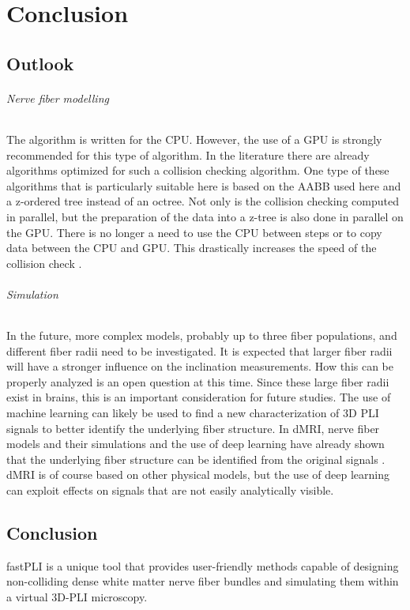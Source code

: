 \cleardoublepage
\part{Conclusion}
% 
% 
% 
\setcounter{chapter}{8}
\chapter{Outlook}
\label{sec:outlook}
% 
% 
\paragraph{Nerve fiber modelling}
% 
The algorithm is written for the \ac{CPU}.
However, the use of a \ac{GPU} is strongly recommended for this type of algorithm.
In the literature there are already algorithms optimized for such a collision checking algorithm.
One type of these algorithms that is particularly suitable here is based on the \ac{AABB} used here and a z-ordered tree instead of an octree.
Not only is the collision checking computed in parallel, but the preparation of the data into a z-tree is also done in parallel on the \ac{GPU}.
There is no longer a need to use the \ac{CPU} between steps or to copy data between the \ac{CPU} and \ac{GPU}.
This drastically increases the speed of the collision check \cite{Karras2012}. 
% 
% 
% 
\paragraph{Simulation}
% 
In the future, more complex models, probably up to three fiber populations, and different fiber radii need to be investigated.
It is expected that larger fiber radii will have a stronger influence on the inclination measurements.
How this can be properly analyzed is an open question at this time.
Since these large fiber radii exist in brains, this is an important consideration for future studies.
The use of machine learning can likely be used to find a new characterization of 3D PLI signals to better identify the underlying fiber structure.
In \ac{dMRI}, nerve fiber models and their simulations and the use of deep learning have already shown that the underlying fiber structure can be identified from the original signals \cite{ginsburgerDis2019}.
\ac{dMRI} is of course based on other physical models, but the use of deep learning can exploit effects on signals that are not easily analytically visible.
% 
% 
% 
% 
% 
\chapter{Conclusion}
\label{sec:conclusion}
% 
% 
\ac{fastPLI} is a unique tool that provides user-friendly methods capable of designing non-colliding dense white matter nerve fiber bundles and simulating them within a virtual \ac{3D-PLI} microscopy.
% 
% 
% 
